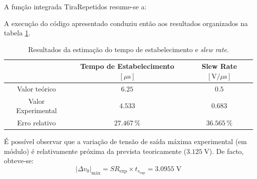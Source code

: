 \documentclass[a4paper,11pt]{report}
\begin{document}
A função integrada TiraRepetidos resume-se a:

\begin{framed}

\end{framed}

A execução do código apresentado conduziu então aos resultados organizados na tabela \ref{tab:TsSR}.

\begin{table}[H]
\centering
\begin{tabular}{c|c||c|}
\cline{2-3}                                         & \textbf{Tempo de Estabelecimento $\left[\mu\textrm{s}\right]$} & \textbf{Slew Rate $\left[\textrm{V}/\mu\textrm{s}\right]$} \\ \hline\hline
\multicolumn{1}{||c||}{Valor teórico}      & $6.25$                                                         & $0.5$                                                      \\ \hline
\multicolumn{1}{||c||}{Valor Experimental} & $4.533$                                                        & $0.683$                                                    \\ \hline
\multicolumn{1}{||c||}{Erro relativo}      & $27.467\,\%$                                                   & $36.565\,\%$                                               \\ \hline
\end{tabular}
\caption{Resultados da estimação do tempo de estabelecimento e \emph{slew rate}.}
\label{tab:TsSR}
\end{table}

É possível observar que a variação de tensão de saída máxima experimental (em módulo) é relativamente próxima da prevista teoricamente ($3.125\;\textrm{V}$). De facto, obteve-se:
\begin{equation}
|\Delta v_0|_{\textrm{máx}}=SR_{\textrm{exp}}\times t_{s_{\textrm{exp}}}=3.0955\;\textrm{V}
\end{equation}
\end{document}
